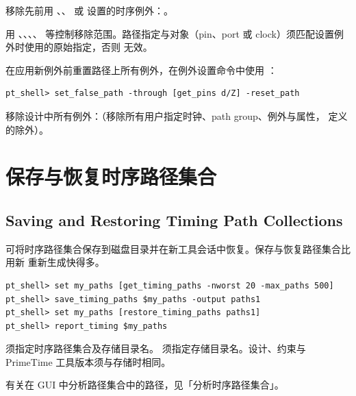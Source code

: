 移除先前用 、、 或  设置的时序例外：。

用 、、、、 等控制移除范围。路径指定与对象（pin、port 或 clock）须匹配设置例外时使用的原始指定，否则  无效。

在应用新例外前重置路径上所有例外，在例外设置命令中使用 ：
\begin{lstlisting}
pt_shell> set_false_path -through [get_pins d/Z] -reset_path
\end{lstlisting}

移除设计中所有例外：（移除所有用户指定时钟、path group、例外与属性， 定义的除外）。

\section{保存与恢复时序路径集合}
\subsection*{Saving and Restoring Timing Path Collections}

可将时序路径集合保存到磁盘目录并在新工具会话中恢复。保存与恢复路径集合比用新  重新生成快得多。

\begin{lstlisting}
pt_shell> set my_paths [get_timing_paths -nworst 20 -max_paths 500]
pt_shell> save_timing_paths $my_paths -output paths1
pt_shell> set my_paths [restore_timing_paths paths1]
pt_shell> report_timing $my_paths
\end{lstlisting}

 须指定时序路径集合及存储目录名。 须指定存储目录名。设计、约束与 PrimeTime 工具版本须与存储时相同。

\begin{seeAlsoBox}
有关在 GUI 中分析路径集合中的路径，见「分析时序路径集合」。
\end{seeAlsoBox}

